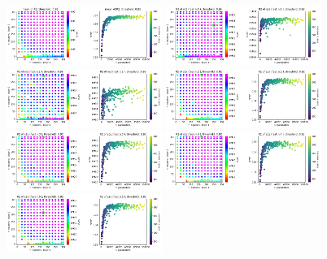 \documentclass[prd,aps,twocolumn,a4paper,showkeys,nofootinbib]{article}
\begin{document}
%
\begin{figure}[]
  \center
  \includegraphics[width=0.45\textwidth]{./Figs/crossval_v0c0_R2mean.png}
  \hspace{0.3cm}
  \includegraphics[width=0.45\textwidth]{./Figs/crossval_v0c0_R2m1.png} \\
  \includegraphics[width=0.45\textwidth]{./Figs/crossval_v0c0_R2m2.png}
  \hspace{0.3cm}
  \includegraphics[width=0.45\textwidth]{./Figs/crossval_v0c0_R2s1x.png} \\
  \includegraphics[width=0.45\textwidth]{./Figs/crossval_v0c0_R2s1y.png}
  \hspace{0.3cm}
  \includegraphics[width=0.45\textwidth]{./Figs/crossval_v0c0_R2s1z.png} \\
  \includegraphics[width=0.45\textwidth]{./Figs/crossval_v0c0_R2s2x.png} 

\end{figure}
\end{document}

